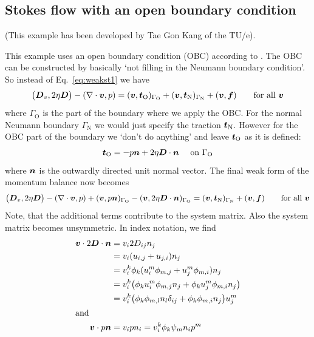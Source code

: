 \subsection{Stokes flow with an open boundary condition}
\label{sec:stokesobc}

(This example has been developed by Tae Gon Kang of the TU/e).

This example uses an open boundary condition (OBC) according to
\cite{Papanastasiou92}. The OBC can be constructed by basically `not filling in
the Neumann boundary condition'. So instead of Eq.~\eqref{eq:weakst1} we have
\begin{equation}
  \big(\boldsymbol{D}_v,2\eta\boldsymbol{D}\big)
    -(\nabla\cdot\boldsymbol{v},p)=(\boldsymbol{v},\boldsymbol{t}_{\text{O}})_{\Gamma_{\text{O}}}+
(\boldsymbol{v},\boldsymbol{t}_{\text{N}})_{\Gamma_{\text{N}}}+(\boldsymbol{v},\boldsymbol{f})
\qquad\text{for all }\boldsymbol{v}
\end{equation}
where $\Gamma_\text{O}$ is the part of the boundary where we apply the OBC. For the
normal Neumann boundary $\Gamma_{\text{N}}$ we would just specify the traction
$\boldsymbol{t}_{\text{N}}$. However for the OBC part of the boundary we `don't do
anything' and leave $\boldsymbol{t}_{\text{O}}$ as it is defined:
\begin{equation}
    \boldsymbol{t}_{\text{O}}=-p\boldsymbol{n}+2\eta \boldsymbol{D}\cdot\boldsymbol{n}
        \quad\text{ on }\Gamma_{\text{O}}
\end{equation}
where $\boldsymbol{n}$ is the outwardly directed unit normal vector. The final weak
form of the momentum balance now becomes
\begin{equation}
  \big(\boldsymbol{D}_v,2\eta\boldsymbol{D}\big)
    -(\nabla\cdot\boldsymbol{v},p)
    +(\boldsymbol{v},p\boldsymbol{n})_{\Gamma_{\text{O}}}
    -(\boldsymbol{v},2\eta \boldsymbol{D}\cdot\boldsymbol{n})_{\Gamma_{\text{O}}}=
(\boldsymbol{v},\boldsymbol{t}_{\text{N}})_{\Gamma_{\text{N}}}+(\boldsymbol{v},\boldsymbol{f})
\qquad\text{for all }\boldsymbol{v}
\label{eq:obcstokes}
\end{equation}
Note, that the additional terms contribute to the system matrix.
Also the system matrix becomes unsymmetric. In index notation,
we find
\begin{align*}
   \boldsymbol{v}\cdot2\boldsymbol{D}\cdot\boldsymbol{n}&=v_i2D_{ij}n_j\\
      &=v_i(u_{i,j}+u_{j,i})n_j\\
      &=v_i^k\phi_k(u_i^m\phi_{m,j}+u_j^m\phi_{m,i})n_j\\
      &=v_i^k\big(\phi_ku_i^m\phi_{m,j}n_j+\phi_ku_j^m\phi_{m,i}n_j\big)\\
      &=v_i^k\big(\phi_k\phi_{m,l}n_l\delta_{ij}
             +\phi_k\phi_{m,i}n_j\big)u_j^m\\
\intertext{and}
   \boldsymbol{v}\cdot p\boldsymbol{n}&=v_ipn_i=v_i^k\phi_k\psi_m n_i p^m
\end{align*}
